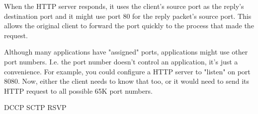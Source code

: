 When the HTTP server responds, it uses the client's source port as the reply's
destination port and it might use port 80 for the reply packet's source port.
This allows the original client to forward the port quickly to the process that
made the request.

Although many applications have "assigned" ports, applications might use other
port numbers. I.e. the port number doesn't control an application, it's just a
convenience. For example, you could configure a HTTP server to "listen" on port
8080. Now, either the client needs to know that too, or it would need to send
its HTTP request to all possible 65K port numbers.

\subsectionend


DCCP
SCTP
RSVP


\sectionend
